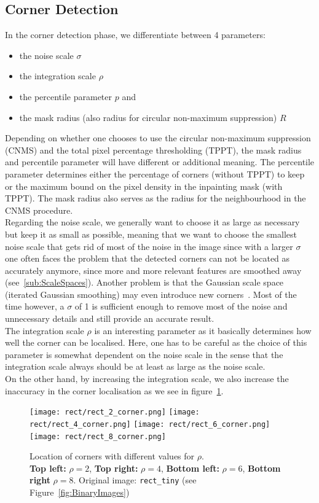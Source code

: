 \subsection{Corner Detection}\label{sec:CornerEx}
In the corner detection phase, we differentiate between 4 parameters:
\begin{itemize}
    \item the noise scale $\sigma$
    \item the integration scale $\rho$
    \item the percentile parameter $p$ and
    \item the mask radius (also radius for circular non-maximum suppression) $R$
\end{itemize}
Depending on whether one chooses to use the circular non-maximum suppression (CNMS) and the total pixel
percentage thresholding (TPPT), the mask radius and percentile parameter will have different or additional
meaning.
The percentile parameter determines either the percentage of corners (without TPPT) to keep or the maximum bound
on the pixel density in the inpainting mask (with TPPT).
The mask radius also serves as the radius for the neighbourhood in the CNMS procedure.\\
Regarding the noise scale, we generally want to choose it as large as necessary but keep it as small as
possible, meaning that we want to choose the smallest noise scale that gets rid of most of the
noise in the image since with a larger $\sigma$ 
one often faces the problem that the detected corners can not be located as accurately anymore,
since more and more relevant features are smoothed away (see~\ref{sub:ScaleSpaces}). Another problem
is that the Gaussian scale space (iterated Gaussian smoothing) may even introduce new
corners~\cite{weickert96}.
 Most of the time however, a $\sigma$ of 1 is sufficient enough to remove most of the noise and unnecessary
 details and still provide an accurate result.\\
 The integration scale $\rho$ is an interesting parameter as it basically determines how well the
 corner can be localised. Here, one has to be careful as the choice of this parameter is somewhat
 dependent on the noise scale in the sense that the integration scale always should be 
 at least as large as the noise scale.\\
 On the other hand, by increasing the integration scale, we also increase the inaccuracy in the corner 
 localisation as we see in figure~\ref{fig:Integration}.\\
\begin{figure}[H]
    \centering
    \texttt{[image: rect/rect\_2\_corner.png]}
    \texttt{[image: rect/rect\_4\_corner.png]}
    \texttt{[image: rect/rect\_6\_corner.png]}
    \texttt{[image: rect/rect\_8\_corner.png]}
    \caption{Location of corners with different values for $\rho$.\\
\textbf{Top left:} $\rho=2$, \textbf{Top right:} $\rho=4$, \textbf{Bottom left:}
$\rho=6$, \textbf{Bottom right} $\rho=8$. Original image: \texttt{rect\_tiny} (see Figure~\ref{fig:BinaryImages})}\label{fig:Integration}
\end{figure}
